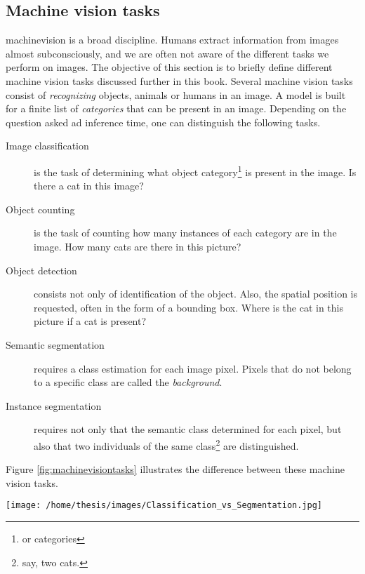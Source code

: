 \subsection{Machine vision tasks \label{sec:machinevisiontasks}}

\Gls{machinevision} is a broad discipline. 
Humans extract information from images almost subconsciously, and we are often not aware of the different tasks we perform on images.
The objective of this section is to briefly define different machine vision tasks discussed further in this book. 
Several machine vision tasks consist of \textit{recognizing} objects, animals or humans in an image.
A model is built for a finite list of \textit{categories} that can be present in an image.
Depending on the question asked ad inference time, one can distinguish the following tasks.

\begin{description}
    \item[Image classification] is the task of determining what object category\footnote{or categories} is present in the image. Is there a cat in this image?
    \item[Object counting] is the task of counting how many instances of each category are in the image. How many cats are there in this picture? 
    \item[Object detection] consists not only of identification of the object. Also, the spatial position is requested, often in the form of a bounding box. Where is the cat in this picture if a cat is present?
    \item[Semantic segmentation] requires a class estimation for each image pixel. Pixels that do not belong to a specific class are called the \textit{background}.
    \item[Instance segmentation] requires not only that the semantic class determined for each pixel, but also that two individuals of the same class\footnote{say, two cats.} are distinguished.   
\end{description}

Figure \ref{fig:machinevisiontasks} illustrates the difference between these machine vision tasks. 

\begin{SCfigure}[][h!]
    \centering
    \texttt{[image: /home/thesis/images/Classification\_vs\_Segmentation.jpg]}
    \caption{Illustration to compare different Machine vision tasks \cite{SemTorch76:online}. 
    Object detection means that the location of several objects is estimated by the model. This is indicated by the \textit{bounding boxes}.
    Segmentation of an image is classifying each pixel in the correct class or assigning it to the \textit{background} class.
    Semantic segmentation makes no difference between different instances of the same semantic class, instance segmentation does.
    \label{fig:machinevisiontasks}}
\end{SCfigure}

